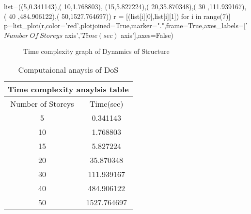 \begin{sagesilent}
list=((5,0.341143),(
10,1.768803),
(15,5.827224),(
20,35.870348),(
30 ,111.939167),(
40 ,484.906122),(
50,1527.764697))
r = [(list[i][0],list[i][1]) for i in range(7)]
p=list_plot(r,color='red',plotjoined=True,marker=".",frame=True,axes_labels=['$Number \ Of \ Storeys$ axis','$Time(sec)$ axis'],axes=False)
\end{sagesilent}

\begin{figure}[H]
	\caption{Time complexity graph of Dynamics of Structure}
\end{figure}



\begin{table}[h]
\centering
\begin{tabular}{ ||c|c|| }
\hline
 \multicolumn{2}{||c||}{Time complexity anaylsis table} \\
 \hline
 Number of Storeys & Time(sec) \\ [0.5ex] 
 \hline \hline
	5 & 0.341143 \\
	10 & 1.768803 \\
	15 & 5.827224 \\
	20 & 35.870348 \\
	30 & 111.939167 \\
	40 & 484.906122 \\
	50 & 1527.764697 \\ [1ex]
 \hline
\end{tabular}
\caption{Computaional anaysis of DoS}
\end{table}


